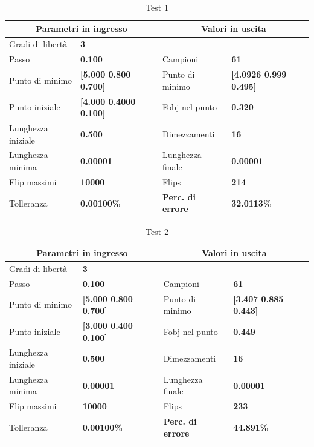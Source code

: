\documentclass[a4paper, 11pt]{article}
\begin{document}
\begin{table}[h]
    \caption{Test 1}
    \begin{center}
    \begin{tabular}{|l|l|l|l|} 
    \hline 
    \multicolumn{2}{|c|}{\textbf{Parametri in ingresso}} & \multicolumn{2}{c|}{\textbf {Valori in uscita}} \\ \hline
    Gradi di libertà  & \textbf{3} &  &  \\ \hline 
    Passo & \textbf{0.100} & Campioni & \textbf{61} \\ \hline 
    Punto di minimo & \textbf{{[}5.000 0.800 0.700{]}} & Punto di minimo & \textbf{{[}4.0926 0.999 0.495{]}} \\ \hline 
    Punto iniziale & \textbf{{[}4.000 0.4000 0.100{]}} & Fobj nel punto & \textbf{0.320} \\ \hline 
    Lunghezza iniziale & \textbf{0.500} & Dimezzamenti & \textbf{16} \\ \hline 
    Lunghezza minima & \textbf{0.00001} & Lunghezza finale & \textbf{0.00001} \\ \hline
    Flip massimi & \textbf{10000} & Flips & \textbf{214} \\ \hline 
    Tolleranza & \textbf{0.00100\%} & \textbf{Perc. di errore} & \textbf{32.0113\%} \\ \hline 
    \end{tabular}
    \end{center}
    \end{table}
    
    \begin{table}[h]
        \caption{Test 2}
        \begin{center}
        \begin{tabular}{|l|l|l|l|} 
        \hline 
        \multicolumn{2}{|c|}{\textbf{Parametri in ingresso}} & \multicolumn{2}{c|}{\textbf {Valori in uscita}} \\ \hline
        Gradi di libertà  & \textbf{3} &  &  \\ \hline 
        Passo & \textbf{0.100} & Campioni & \textbf{61} \\ \hline 
        Punto di minimo & \textbf{{[}5.000 0.800 0.700{]}} & Punto di minimo & \textbf{{[}3.407 0.885 0.443{]}} \\ \hline 
        Punto iniziale & \textbf{{[}3.000 0.400 0.100{]}} & Fobj nel punto & \textbf{0.449} \\ \hline 
        Lunghezza iniziale & \textbf{0.500} & Dimezzamenti & \textbf{16} \\ \hline 
        Lunghezza minima & \textbf{0.00001} & Lunghezza finale & \textbf{0.00001} \\ \hline
        Flip massimi & \textbf{10000} & Flips & \textbf{233} \\ \hline 
        Tolleranza & \textbf{0.00100\%} & \textbf{Perc. di errore} & \textbf{44.891\%} \\ \hline 
        \end{tabular}
        \end{center}
        \end{table}
        
\end{document}
